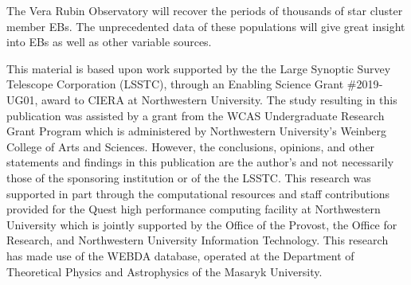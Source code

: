 \documentclass[RNAAS]{aastex63}
\begin{document}
The Vera Rubin Observatory will recover the periods of thousands of star cluster member EBs. The unprecedented data of these populations will give great insight into EBs as well as other variable sources.

\acknowledgments
\label{sec:Acknowledgements}
This material is based upon work supported by the the Large Synoptic Survey Telescope Corporation (LSSTC), through an Enabling Science Grant \#2019‐UG01, award to CIERA at Northwestern University.
The study resulting in this publication was assisted by a grant from the WCAS Undergraduate Research Grant Program which is administered by Northwestern University's Weinberg College of Arts and Sciences. However, the conclusions, opinions, and other statements and findings in this publication are the author's and not necessarily those of the sponsoring institution or of the the LSSTC.
This research was supported in part through the computational resources and staff contributions provided for the Quest high performance computing facility at Northwestern University which is jointly supported by the Office of the Provost, the Office for Research, and Northwestern University Information Technology.
This research has made use of the WEBDA database, operated at the Department of Theoretical Physics and Astrophysics of the Masaryk University. 

\nocite{*}

% 
\end{document}
